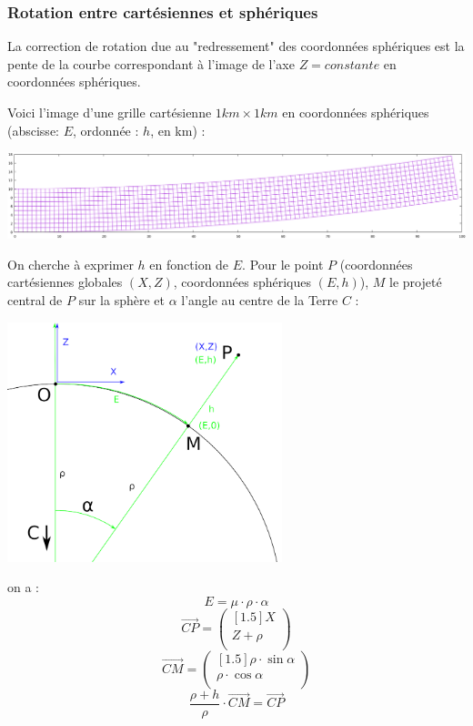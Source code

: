 \documentclass[french]{report}
\begin{document}
\subsubsection{Rotation entre cartésiennes et sphériques}


La correction de rotation due au "redressement" des coordonnées sphériques
est la pente de la courbe correspondant à l'image de l'axe $Z = constante$
en coordonnées sphériques.

Voici l'image d'une grille cartésienne $1km \times 1km$ en coordonnées sphériques (abscisse: $E$, ordonnée : $h$, en km) :
\begin{center}
\includegraphics[width = 15cm]{images/cartgrid_in_spherical}
\end{center}


On cherche à exprimer $h$ en fonction de $E$. Pour le point $P$ (coordonnées cartésiennes globales $(X,Z)$,
coordonnées sphériques $(E, h)$), $M$ le projeté central de $P$ sur la sphère et $\alpha$ l'angle au centre de la Terre $C$ :

\begin{center}
\includegraphics[width = 8cm]{images/ex_approx_spher_xyz_h_vs_E}
\end{center}


on a :
 $$ E = \mu \cdot \rho \cdot \alpha $$
 $$ \overrightarrow{CP} =
 \begin{pmatrix}[1.5]
X \\
Z + \rho \\
\end{pmatrix} $$
 $$ \overrightarrow{CM} =
 \begin{pmatrix}[1.5]
\rho \cdot \sin{\alpha} \\
\rho \cdot \cos{\alpha} \\
\end{pmatrix} $$
 $$ \frac{\rho+h}{\rho} \cdot \overrightarrow{CM} = \overrightarrow{CP} $$
\end{document}
